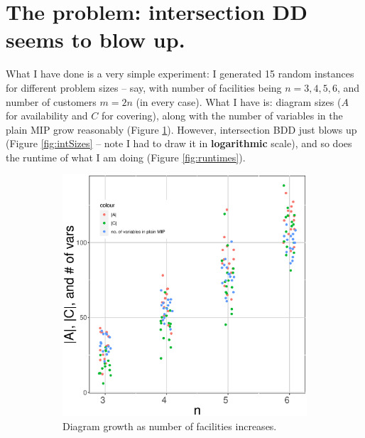 \documentclass[11pt]{article}
\begin{document}
\section{The problem: intersection DD seems to blow up.}
\label{sec:org3d9839a}
What I have done is a very simple experiment: I generated 15 random instances
for different problem sizes -- say, with number of facilities being \(n=3,4,5,6\),
and number of customers \(m=2n\) (in every case). What I have is: diagram sizes
(\(A\) for availability and \(C\) for covering), along with the number of variables
in the plain MIP grow reasonably (Figure \ref{fig:ACsizes}). However,
intersection BDD just blows up (Figure \ref{fig:intSizes} -- note I had to draw it in
\textbf{logarithmic} scale), and so does the runtime of what I am doing (Figure
\ref{fig:runtimes}).

\begin{figure}
  \begin{subfigure}{0.45\textwidth}
    \includegraphics[width=\textwidth]{AandCsizes.eps}
    \caption{Diagram growth as number of facilities increases.}
    \label{fig:ACsizes}
  \end{subfigure}
  \hfill
  \begin{subfigure}{0.45\textwidth}

\end{subfigure}
\end{figure}
\end{document}

